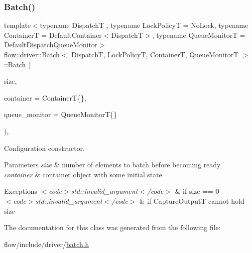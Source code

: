 \subsubsection{\texorpdfstring{Batch()}{Batch()}}
{\footnotesize\ttfamily template$<$typename DispatchT , typename Lock\+PolicyT  = No\+Lock, typename ContainerT  = Default\+Container$<$\+Dispatch\+T$>$, typename Queue\+MonitorT  = Default\+Dispatch\+Queue\+Monitor$>$ \\
\hyperlink{classflow_1_1driver_1_1_batch}{flow\+::driver\+::\+Batch}$<$ DispatchT, Lock\+PolicyT, ContainerT, Queue\+MonitorT $>$\+::\hyperlink{classflow_1_1driver_1_1_batch}{Batch} (\begin{DoxyParamCaption}\item[{const \hyperlink{classflow_1_1driver_1_1_batch_a81f688882ffe1a15ab3d8af872ffe6f7}{size\+\_\+type}}]{size,  }\item[{const ContainerT \&}]{container = {\ttfamily ContainerT\{\}},  }\item[{const Queue\+MonitorT \&}]{queue\+\_\+monitor = {\ttfamily QueueMonitorT\{\}} }\end{DoxyParamCaption})\hspace{0.3cm}{\ttfamily [explicit]}, {\ttfamily [noexcept]}}



Configuration constructor. 


\begin{DoxyParams}{Parameters}
{\em size} & number of elements to batch before becoming ready \\
\hline
{\em container} & container object with some initial state\\
\hline
\end{DoxyParams}

\begin{DoxyExceptions}{Exceptions}
{\em $<$code$>$std\+::invalid\+\_\+argument$<$/code$>$} & if {\ttfamily size == 0} \\
\hline
{\em $<$code$>$std\+::invalid\+\_\+argument$<$/code$>$} & if {\ttfamily Capture\+OutputT} cannot hold {\ttfamily size} \\
\hline
\end{DoxyExceptions}


The documentation for this class was generated from the following file\+:\begin{DoxyCompactItemize}
\item 
flow/include/driver/\hyperlink{batch_8h}{batch.\+h}\end{DoxyCompactItemize}
